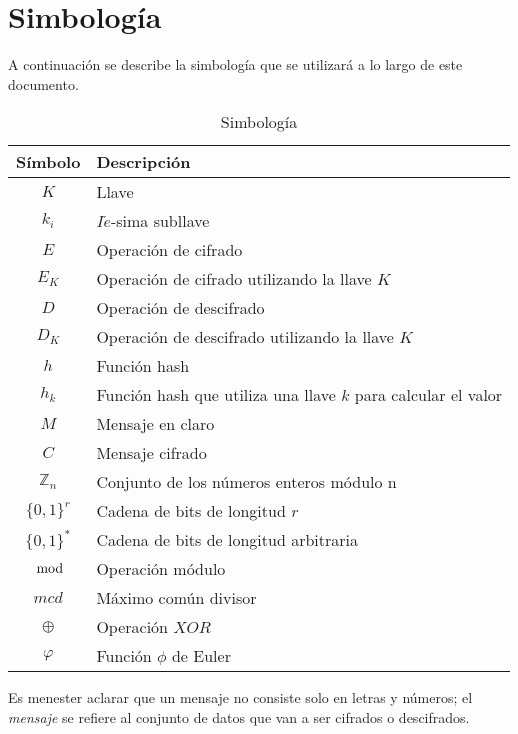\section*{Simbología}

A continuación se describe la simbología que se utilizará a lo largo de
este documento.

\begin{table}[H]
  \caption{Simbología}\label{tab:simb}
  \begin{center}
    \begin{tabular}{c|l}
      Símbolo & Descripción \\
      \hline
      $K$ & Llave \\
      \hline
      $k_i$ & $I\acute{e}$-sima subllave \\
      \hline
      $E$ & Operación de cifrado \\
      \hline
      $E_K$ & Operación de cifrado utilizando la llave $K$ \\
      \hline
      $D$ & Operación de descifrado \\
      \hline
      $D_K$ & Operación de descifrado utilizando la llave $K$ \\
      \hline
      $h$ & Función hash \\
      \hline
      $h_k$ & Función hash que utiliza una llave $k$ para calcular el valor\\
      \hline
      $M$ & Mensaje en claro\\
      \hline
      $C$ & Mensaje cifrado\\
      \hline
      $\mathbb{Z}_n$ & Conjunto de los números enteros módulo n\\
      \hline
      $\{0,1\}^r$ & Cadena de bits de longitud $r$ \\
      \hline
      $\{0,1\}^*$ & Cadena de bits de longitud arbitraria \\
      \hline
      $\mod$ & Operación módulo \\
      \hline
      $mcd$ & Máximo común divisor \\
      \hline
      $\oplus$ & Operación $XOR$ \\
      \hline
      $\varphi$ & Función $\phi$ de Euler \\
      \hline
    \end{tabular}
  \end{center}
\end{table}

Es menester aclarar que un mensaje no consiste solo en letras y números;
el \textit{mensaje} se refiere al conjunto de datos que van a ser
cifrados o descifrados.
